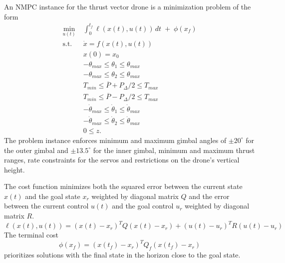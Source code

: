 \documentclass[conf]{new-aiaa}
\newcommand{\nmpc}{NMPC}
\newcommand{\pdiff}{P_{\Delta}}
\newcommand{\pavg}{\overline{P}}
\begin{document}
An {\nmpc} instance for the thrust vector drone is a minimization problem of the form
\begin{align}
	\min_{u(t)} \; &  \int_{0}^{t_f} \ell(x(t),u(t))\,dt  \;+\; \phi(x_f) \nonumber \\
	\text{s.t.} \;\; 	&  \dot{x} =  f(x(t),u(t))  \nonumber \\ 
	& x(0) = x_0 \nonumber \\
	&	-\theta_{max} \leq \theta_1 \leq \theta_{max} \nonumber \\
	& 	-\theta_{max} \leq \theta_2 \leq \theta_{max} \nonumber \\
	& 	T_{min}  \leq \pavg + \pdiff/2 \leq T_{max} \nonumber  \\
	&    T_{min} \leq  \pavg - \pdiff/2 \leq T_{max} \nonumber \\
	& 	-\dot{\theta}_{max} \leq \dot{\theta}_1 \leq \dot{\theta}_{max} \nonumber \\
	&  	-\dot{\theta}_{max} \leq \dot{\theta}_2 \leq \dot{\theta}_{max} \nonumber \\ 
	&        0 \leq z.\nonumber
\end{align}
The problem instance enforces minimum and maximum gimbal angles of $\pm 20^{\circ}$ for the outer gimbal and $\pm 13.5^{\circ}$ for the inner gimbal, minimum and maximum thrust ranges, rate constraints for the servos and restrictions on the drone's vertical height.

The cost function  minimizes both the squared error between the current state $x(t)$ and the goal state $x_{r}$ weighted by diagonal matrix $Q$ and the error between the current control $u(t)$ and the goal control $u_{r}$ weighted by diagonal matrix $R$. 
\begin{equation*}
	\ell(x(t),u(t))= (x(t)-x_{r})^T Q (x(t)-x_{r}) + (u(t)-u_{r})^T R (u(t)-u_{r}) 
\end{equation*}
The terminal cost  
\begin{equation*}
	\phi(x_f) = (x(t_f)-x_{r})^T Q_f (x(t_f)-x_{r})
\end{equation*}
prioritizes solutions with the final state in the horizon close  to the goal state.
\end{document}
